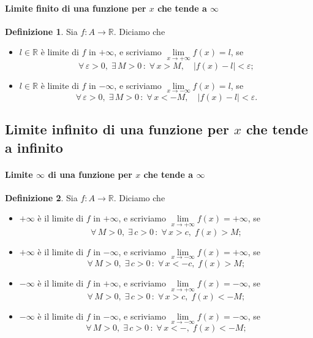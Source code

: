 \documentclass{article}
\theoremstyle{plain}
\theoremstyle{definition}
\newtheorem{defn}{Definizione}[section]
\theoremstyle{remark}
\begin{document}
\vspace{10pt}

\paragraph{Limite finito di una funzione per $x$ che tende a $\infty$}
\begin{bxthm}
\begin{defn}
    Sia $f:A\to\mathbb{R}$. Diciamo che 
    \begin{itemize}
        \item $l\in\mathbb{R}$ è limite di $f$ in $+\infty$, e scriviamo $\lim\limits_{x\to+\infty}f(x)=l$, se 
        \[\forall\,\varepsilon>0,\;\exists\, M>0\,:\;\forall\, x>M,\quad |f(x)-l|<\varepsilon;\]
        \item $l\in\mathbb{R}$ è limite di $f$ in $-\infty$, e scriviamo $\lim\limits_{x\to-\infty}f(x)=l$, se 
        \[\forall\,\varepsilon>0,\;\exists\, M>0\,:\;\forall\, x<-M,\quad |f(x)-l|<\varepsilon.\]
    \end{itemize}
\end{defn}
\end{bxthm}

\vspace{20pt}

\subsection{Limite infinito di una funzione per $x$ che tende a infinito}

\vspace{10pt}

\paragraph{Limite $\infty$ di una funzione per $x$ che tende a $\infty$}
\begin{bxthm}
\begin{defn}
    Sia $f:A\to\mathbb{R}$. Diciamo che 
    \begin{itemize}
        \item $+\infty$ è il limite di $f$ in $+\infty$, e scriviamo $\lim\limits_{x\to+\infty}f(x)=+\infty$, se 
        \[\forall\,M>0,\;\exists\,c>0\,:\;\forall\,x>c,\;f(x)>M;\]
        \item $+\infty$ è il limite di $f$ in $-\infty$, e scriviamo $\lim\limits_{x\to-\infty}f(x)=+\infty$, se 
        \[\forall\,M>0,\;\exists\,c>0\,:\;\forall\,x<-c,\;f(x)>M;\]
        \item $-\infty$ è il limite di $f$ in $+\infty$, e scriviamo $\lim\limits_{x\to+\infty}f(x)=-\infty$, se 
        \[\forall\,M>0,\;\exists\,c>0\,:\;\forall\,x>c,\;f(x)<-M;\]
        \item $-\infty$ è il limite di $f$ in $-\infty$, e scriviamo $\lim\limits_{x\to-\infty}f(x)=-\infty$, se 
        \[\forall\,M>0,\;\exists\,c>0\,:\;\forall\,x<-,\;f(x)<-M;\]
    \end{itemize}
\end{defn}
\end{bxthm}
\end{document}
